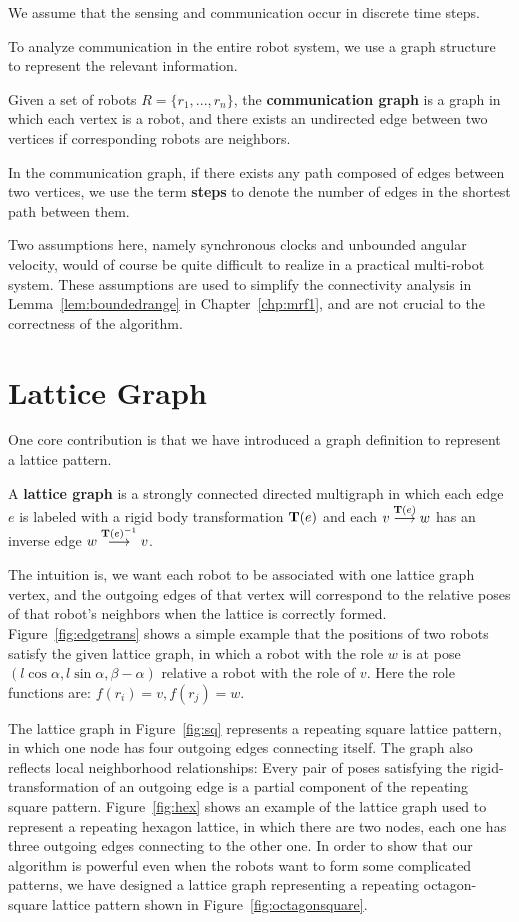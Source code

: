 We assume that the sensing and communication occur in discrete time steps. 

To analyze communication in the entire robot system, we use a graph structure to represent the relevant information.

\begin{defn}
  Given a set of robots $R =\{r_1, ..., r_n\}$, the \textbf{communication
  graph} is a graph in which each vertex is a robot, and there exists an
  undirected edge between two vertices if corresponding robots are neighbors.
\end{defn}

In the communication graph, if there exists any path composed of edges between two vertices, we use the term
\textbf{steps} to denote the number of edges in the shortest path between
them.

Two assumptions here, namely synchronous clocks and unbounded angular velocity, 
would of course be quite difficult to realize in a practical multi-robot system. 
%
These assumptions are used to simplify the connectivity analysis in Lemma~\ref{lem:boundedrange} in Chapter~\ref{chp:mrf1}, 
and are not crucial to the correctness of the algorithm.


\section{Lattice Graph}
\label{sec:latt-graph}
One core contribution is that we have introduced a graph definition to represent a lattice pattern.
%
\begin{defn}
  \label{def:latticegraph}
  A \textbf{lattice graph} is a strongly connected directed multigraph in which
  each edge $e$ is labeled with a rigid body transformation $\mathbf{T}(e)$ and each
  ${v}\overset{\mathbf{T}(e)}{\longrightarrow}{w}$ has an inverse edge ${w}\overset{\mathbf{T}(e)^{-1}}{\longrightarrow}{v}$.
\end{defn}

The intuition is, we want each robot to be associated with one lattice graph vertex, 
and the outgoing edges of that vertex will correspond to the relative poses of that robot's neighbors when the lattice is correctly formed.
%
Figure~\ref{fig:edgetrans} shows a simple example that the positions of two
robots satisfy the given lattice graph, in which a robot with the role $w$ is
at pose $(l\cos{\alpha}, l\sin{\alpha}, \beta-\alpha)$ relative a robot with the role of
$v$. Here the role functions are: $f(r_i) = v, f(r_j) = w$.


The lattice graph in Figure~\ref{fig:sq} represents a repeating square lattice pattern, 
in which one node has four outgoing edges connecting itself. 
%
The graph also reflects local neighborhood relationships:
%
Every pair of poses satisfying the rigid-transformation of an outgoing edge is a partial component of the repeating square pattern.
%
Figure~\ref{fig:hex} shows an example of the lattice graph used to represent a
repeating hexagon lattice, in which there are two nodes, each one has three outgoing edges connecting to the other one. 
%
In order to show that our algorithm is powerful even when the robots want to form some complicated patterns, 
we have designed a lattice graph representing a repeating octagon-square lattice pattern shown in Figure~\ref{fig:octagonsquare}.
%


